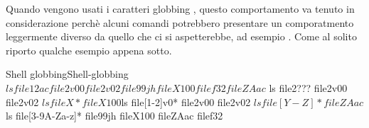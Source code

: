 Quando vengono usati i caratteri globbing , questo comportamento va tenuto in considerazione perchè alcuni comandi potrebbero presentare un comporatmento leggermente diverso da quello che ci si aspetterebbe, ad esempio . Come al solito riporto qualche esempio appena sotto.
\begin{cmdc}{Shell globbing}{Shell-globbing}
	$ ls
	file12ac  file2v00  file2v02  file99jh  fileX100  filef32  fileZAac
	$ ls file2???
	file2v00  file2v02
	$ ls fileX*
	fileX100
	$ls file[1-2]v0*
	file2v00  file2v02
	$ ls file[Y-Z]*
	fileZAac
	$ ls file[3-9A-Za-z]*
	file99jh  fileX100  fileZAac  filef32
\end{cmdc}

